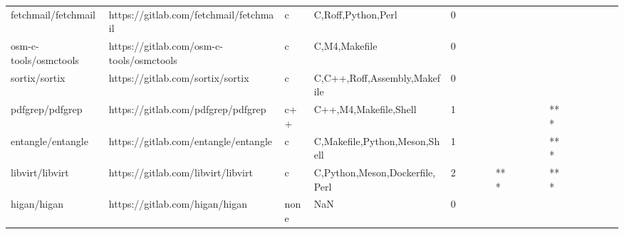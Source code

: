 \begin{tabular}{llllrlllllllllllll}
fetchmail/fetchmail                                &             https://gitlab.com/fetchmail/fetchmail &                 c &                                 C,Roff,Python,Perl &       0 &         &        &           &                &                 &        &           &           &          &          &       &              &          \\
osm-c-tools/osmctools                              &           https://gitlab.com/osm-c-tools/osmctools &                 c &                                      C,M4,Makefile &       0 &         &        &           &                &                 &        &           &           &          &          &       &              &          \\
sortix/sortix                                      &                   https://gitlab.com/sortix/sortix &                 c &                       C,C++,Roff,Assembly,Makefile &       0 &         &        &           &                &                 &        &           &           &          &          &       &              &          \\
pdfgrep/pdfgrep                                    &                 https://gitlab.com/pdfgrep/pdfgrep &               c++ &                              C++,M4,Makefile,Shell &       1 &         &        &           &                &                 &        &           &       *** &          &          &       &              &          \\
entangle/entangle                                  &               https://gitlab.com/entangle/entangle &                 c &                      C,Makefile,Python,Meson,Shell &       1 &         &        &           &                &                 &        &           &       *** &          &          &       &              &          \\
libvirt/libvirt                                    &                 https://gitlab.com/libvirt/libvirt &                 c &                     C,Python,Meson,Dockerfile,Perl &       2 &         &        &           &            *** &                 &        &           &       *** &          &          &       &              &          \\
higan/higan                                        &                     https://gitlab.com/higan/higan &              none &                                                NaN &       0 &         &        &           &                &                 &        &           &           &          &          &       &              &          \\

\end{tabular}
